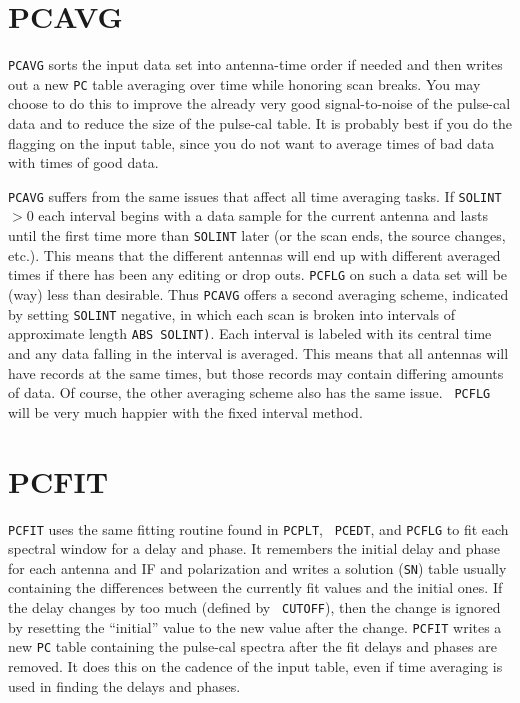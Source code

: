 \documentclass[twoside]{article}
\begin{document}
\section{PCAVG}

{\tt PCAVG} sorts the input data set into antenna-time order if needed
and then writes out a new {\tt PC} table averaging over time while
honoring scan breaks.  You may choose to do this to improve the
already very good signal-to-noise of the pulse-cal data and to reduce
the size of the pulse-cal table.  It is probably best if you do the
flagging on the input table, since you do not want to average times of
bad data with times of good data.

{\tt PCAVG} suffers from the same issues that affect all time
averaging tasks.  If {\tt SOLINT}$ > 0$ each interval begins with a
data sample for the current antenna and lasts until the first time
more than {\tt SOLINT} later (or the scan ends, the source changes,
etc.).  This means that the different antennas will end up with
different averaged times if there has been any editing or drop outs.
{\tt PCFLG} on such a data set will be (way) less than desirable.
Thus {\tt PCAVG} offers a second averaging scheme, indicated by
setting {\tt SOLINT} negative, in which each scan is broken into
intervals of approximate length {\tt ABS SOLINT)}.  Each interval is
labeled with its central time and any data falling in the interval is
averaged.  This means that all antennas will have records at the same
times, but those records may contain differing amounts of data.  Of
course, the other averaging scheme also has the same issue. {\tt
  PCFLG} will be very much happier with the fixed interval method.

\section{PCFIT}

{\tt PCFIT} uses the same fitting routine found in {\tt PCPLT}, {\tt
  PCEDT}, and {\tt PCFLG} to fit each spectral window for a delay and
phase.  It remembers the initial delay and phase for each antenna and
IF and polarization and writes a solution ({\tt SN}) table usually
containing the differences between the currently fit values and the
initial ones.  If the delay changes by too much (defined by {\tt
  CUTOFF}), then the change is ignored by resetting the ``initial''
value to the new value after the change.  {\tt PCFIT} writes a new
{\tt PC} table containing the pulse-cal spectra after the fit delays
and phases are removed.  It does this on the cadence of the input
table, even if time averaging is used in finding the delays and
phases.
\end{document}
